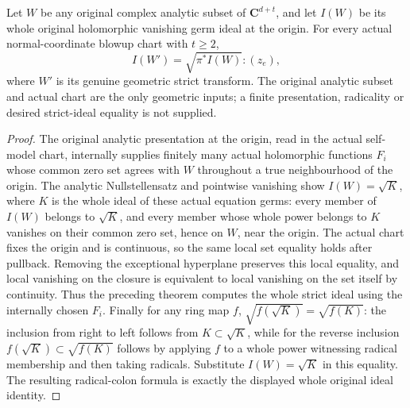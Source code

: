 \begin{theorem}
\label{hir:actual-original-analytic-strict-whole-radical-pullback}
\leanok
Let $W$ be any original complex analytic subset of $\mathbf C^{d+t}$,
and let $I(W)$ be its whole original holomorphic vanishing germ ideal at
the origin. For every actual normal-coordinate blowup chart with $t\ge2$,
\[
 I(W')=\sqrt{\pi^* I(W)}:(z_e),
\]
where $W'$ is its genuine geometric strict transform. The original
analytic subset and actual chart are the only geometric inputs; a finite
presentation, radicality or desired strict-ideal equality is not supplied.
\end{theorem}
\begin{proof}
The original analytic presentation at the origin, read in the actual
self-model chart, internally supplies finitely many actual holomorphic
functions $F_i$ whose common zero set agrees with $W$ throughout a true
neighbourhood of the origin. The analytic Nullstellensatz and pointwise
vanishing show $I(W)=\sqrt K$, where $K$ is the whole ideal of these
actual equation germs: every member of $I(W)$ belongs to $\sqrt K$,
and every member whose whole power belongs to $K$ vanishes on their common
zero set, hence on $W$, near the origin. The actual chart fixes the origin
and is continuous, so the same local set equality holds after pullback.
Removing the exceptional hyperplane preserves this local equality, and
local vanishing on the closure is equivalent to local vanishing on the
set itself by continuity. Thus the preceding theorem computes the whole
strict ideal using the internally chosen $F_i$. Finally for any ring
map $f$, $\sqrt{f(\sqrt K)}=\sqrt{f(K)}$: the inclusion from right to
left follows from $K\subset\sqrt K$, while for the reverse inclusion
$f(\sqrt K)\subset\sqrt{f(K)}$ follows by applying $f$ to a whole
power witnessing radical membership and then taking radicals. Substitute
$I(W)=\sqrt K$ in this equality. The resulting radical-colon formula is
exactly the displayed whole original ideal identity.
\end{proof}
